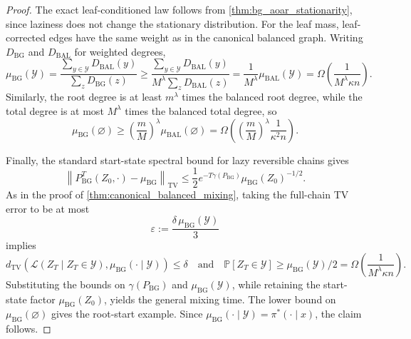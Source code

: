\documentclass{article}
\numberwithin{theorem}{section}
\numberwithin{proposition}{section}
\numberwithin{corollary}{section}
\numberwithin{lemma}{section}
\numberwithin{conjecture}{section}
\numberwithin{remark}{section}
\numberwithin{definition}{section}
\numberwithin{assumption}{section}
\numberwithin{example}{section}
\newcommand{\calY}{{\mathcal{Y}}}
\begin{document}
\begin{proof}
The exact leaf-conditioned law follows from \cref{thm:bg_aoar_stationarity}, since laziness does not change the stationary distribution. For the leaf mass, leaf-corrected edges have the same weight as in the canonical balanced graph. Writing $D_{\mathrm{BG}}$ and $D_{\mathrm{BAL}}$ for weighted degrees,
\begin{equation*}
    \mu_{\mathrm{BG}}(\calY)
    =
    \frac{\sum_{y\in\calY}D_{\mathrm{BAL}}(y)}
    {\sum_z D_{\mathrm{BG}}(z)}
    \ge
    \frac{\sum_{y\in\calY}D_{\mathrm{BAL}}(y)}
    {M^\lambda\sum_zD_{\mathrm{BAL}}(z)}
    =
    \frac{1}{M^\lambda}\mu_{\mathrm{BAL}}(\calY)
    =
    \Omega\!\left(
        \frac{1}{M^\lambda\kappa n}
    \right).
\end{equation*}
Similarly, the root degree is at least $m^\lambda$ times the balanced root degree, while the total degree is at most $M^\lambda$ times the balanced total degree, so
\begin{equation*}
    \mu_{\mathrm{BG}}(\varnothing)
    \ge
    \left(\frac{m}{M}\right)^\lambda\mu_{\mathrm{BAL}}(\varnothing)
    =
    \Omega\!\left(
        \left(\frac{m}{M}\right)^\lambda
        \frac{1}{\kappa^2 n}
    \right).
\end{equation*}

Finally, the standard start-state spectral bound for lazy reversible chains \citep{levin2017markov} gives
\begin{equation*}
    \left\|
        P_{\mathrm{BG}}^T(Z_0,\cdot)-\mu_{\mathrm{BG}}
    \right\|_{\mathrm{TV}}
    \le
    \frac12
    e^{-T\gamma(P_{\mathrm{BG}})}
    \mu_{\mathrm{BG}}(Z_0)^{-1/2}.
\end{equation*}
As in the proof of \cref{thm:canonical_balanced_mixing}, taking the full-chain TV error to be at most
\begin{equation*}
    \varepsilon:=\frac{\delta\,\mu_{\mathrm{BG}}(\calY)}{3}
\end{equation*}
implies
\begin{equation*}
    d_{\mathrm{TV}}
    \left(
        \mathcal L(Z_T\mid Z_T\in\calY),
        \mu_{\mathrm{BG}}(\cdot\mid\calY)
    \right)
    \le
    \delta \quad \text{and} \quad \mathbb{P}[Z_T \in \calY] \geq \mu_{\mathrm{BG}}(\calY)/2 = \Omega\!\left(
        \frac{1}{M^\lambda\kappa n}\right).
\end{equation*}
Substituting the bounds on \(\gamma(P_{\mathrm{BG}})\) and \(\mu_{\mathrm{BG}}(\calY)\), while retaining the start-state factor \(\mu_{\mathrm{BG}}(Z_0)\), yields the general mixing time. The lower bound on \(\mu_{\mathrm{BG}}(\varnothing)\) gives the root-start example. Since $\mu_{\mathrm{BG}}(\cdot\mid\calY)=\pi^*(\cdot\mid x)$, the claim follows.
\end{proof}
\end{document}
